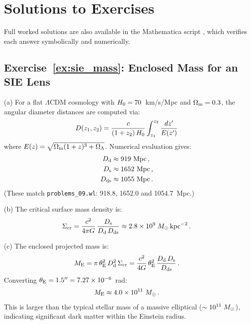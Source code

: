 
\section{Solutions to Exercises}
\label{sec:galaxy_lensing_solutions}

\noindent
Full worked solutions are also available in the Mathematica script
,
which verifies each answer symbolically and numerically.

\subsection*{Exercise~\ref{ex:sie_mass}: Enclosed Mass for an SIE Lens}

(a) For a flat $\Lambda$CDM cosmology with $H_0 = 70$~km/s/Mpc
and $\Omega_{\mathrm{m}} = 0.3$, the angular diameter distances are computed via:
\begin{equation*}
    D(z_1, z_2) = \frac{c}{(1+z_2)\,H_0}
    \int_{z_1}^{z_2} \frac{dz'}{E(z')}
\end{equation*}
where $E(z) = \sqrt{\Omega_{\mathrm{m}}(1+z)^3 + \Omega_{\Lambda}}$.  Numerical
evaluation gives:
\begin{align*}
    D_{\mathrm{d}} &\approx 919~\mathrm{Mpc} \,, \\
    D_{\mathrm{s}} &\approx 1652~\mathrm{Mpc} \,, \\
    D_{\mathrm{ds}} &\approx 1055~\mathrm{Mpc} \,.
\end{align*}
(These match \texttt{problems\_09.wl}: 918.8, 1652.0 and 1054.7~Mpc.)

(b) The critical surface mass density is:
\begin{equation*}
    \Sigma_{\mathrm{cr}} = \frac{c^2}{4\pi G}
    \,\frac{D_{\mathrm{s}}}{D_{\mathrm{d}}\,D_{\mathrm{ds}}}
    \approx 2.8 \times 10^9\;M_{\odot}\,\mathrm{kpc}^{-2} \,.
\end{equation*}

(c) The enclosed projected mass is:
\begin{equation*}
    M_{\mathrm{E}} = \pi\,\theta_{\mathrm{E}}^2\,D_{\mathrm{d}}^2\,\Sigma_{\mathrm{cr}}
    = \frac{c^2}{4G}\,\theta_{\mathrm{E}}^2\,
    \frac{D_{\mathrm{d}}\,D_{\mathrm{s}}}{D_{\mathrm{ds}}} \,.
\end{equation*}
Converting $\theta_{\mathrm{E}} = 1.5'' = 7.27 \times 10^{-6}$~rad:
\begin{equation*}
    M_{\mathrm{E}} \approx 4.0 \times 10^{11}\;M_{\odot} \,.
\end{equation*}
This is larger than the typical stellar mass of a massive elliptical
($\sim 10^{11}\;M_{\odot}$), indicating significant dark matter within
the Einstein radius. \checkmark

